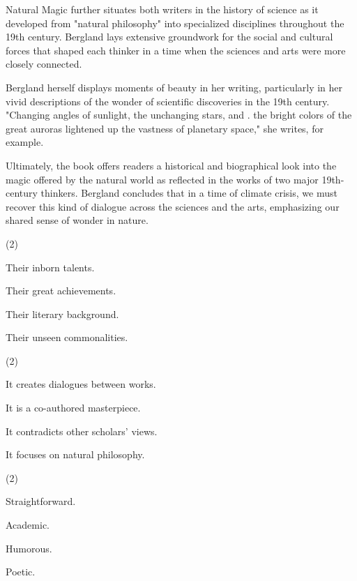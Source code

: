 \documentclass{英语试卷}
\begin{document}
\par Natural Magic further situates both writers in the history of science as it developed from "natural philosophy" into specialized disciplines throughout the 19th century. Bergland lays extensive groundwork for the social and cultural forces that shaped each thinker in a time when the sciences and arts were more closely connected.\par
\par Bergland herself displays moments of beauty in her writing, particularly in her vivid descriptions of the wonder of scientific discoveries in the 19th century. "Changing angles of sunlight, the unchanging stars, and . the bright colors of the great auroras lightened up the vastness of planetary space," she writes, for example.\par
\par Ultimately, the book offers readers a historical and biographical look into the magic offered by the natural world as reflected in the works of two major 19th-century thinkers. Bergland concludes that in a time of climate crisis, we must recover this kind of dialogue across the sciences and the arts, emphasizing our shared sense of wonder in nature.\par
{}
\begin{choices}(2)
  \item Their inborn talents.
  \item Their great achievements.
  \item Their literary background.
  \item Their unseen commonalities.
\end{choices}
\begin{choices}(2)
  \item It creates dialogues between works.
  \item It is a co-authored masterpiece.
  \item It contradicts other scholars' views.
  \item It focuses on natural philosophy.
\end{choices}
\begin{choices}(2)
  \item Straightforward.
  \item Academic.
  \item Humorous.
  \item Poetic.
\end{choices}
\end{document}
